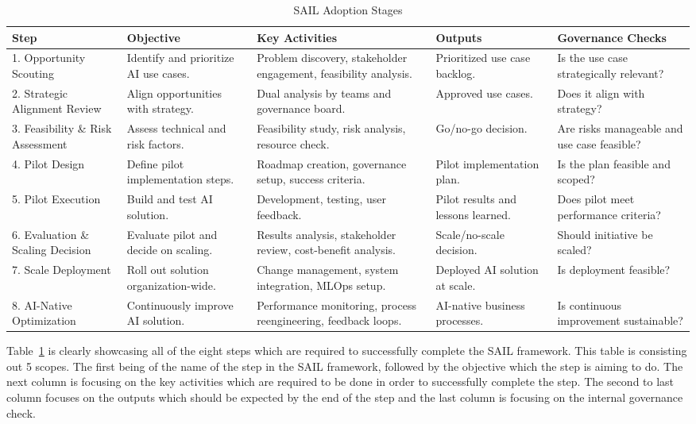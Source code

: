 \documentclass[]{imc-inf}
\begin{document}
\begin{table}[H]
\centering
\footnotesize
\begin{tabular}{|p{2.0cm}|p{2.3cm}|p{2.8cm}|p{2.3cm}|p{2.3cm}|}
\hline
\textbf{Step} & \textbf{Objective} & \textbf{Key Activities} & \textbf{Outputs} & \textbf{Governance Checks} \\
\hline
1. Opportunity Scouting & Identify and prioritize AI use cases. & Problem discovery, stakeholder engagement, feasibility analysis. & Prioritized use case backlog. & Is the use case strategically relevant? \\
\hline
2. Strategic Alignment Review & Align opportunities with strategy. & Dual analysis by teams and governance board. & Approved use cases. & Does it align with strategy? \\
\hline
3. Feasibility \& Risk Assessment & Assess technical and risk factors. & Feasibility study, risk analysis, resource check. & Go/no-go decision. & Are risks manageable and use case feasible? \\
\hline
4. Pilot Design & Define pilot implementation steps. & Roadmap creation, governance setup, success criteria. & Pilot implementation plan. & Is the plan feasible and scoped? \\
\hline
5. Pilot Execution & Build and test AI solution. & Development, testing, user feedback. & Pilot results and lessons learned. & Does pilot meet performance criteria? \\
\hline
6. Evaluation \& Scaling Decision & Evaluate pilot and decide on scaling. & Results analysis, stakeholder review, cost-benefit analysis. & Scale/no-scale decision. & Should initiative be scaled? \\
\hline
7. Scale Deployment & Roll out solution organization-wide. & Change management, system integration, MLOps setup. & Deployed AI solution at scale. & Is deployment feasible? \\
\hline
8. AI-Native Optimization & Continuously improve AI solution. & Performance monitoring, process reengineering, feedback loops. & AI-native business processes. & Is continuous improvement sustainable? \\
\hline
\end{tabular}
\caption{SAIL Adoption Stages}
\label{tab:sail_adoption_stages}
\end{table}

Table~\ref{tab:sail_adoption_stages} is clearly showcasing all of the eight steps which are required to successfully complete the SAIL framework. This table is consisting out 5 scopes. The first being of the name of the step in the SAIL framework, followed by the objective which the step is aiming to do. The next column is focusing on the key activities which are required to be done in order to successfully complete the step. The second to last column focuses on the outputs which should be expected by the end of the step and the last column is focusing on the internal governance check.  
\end{document}
